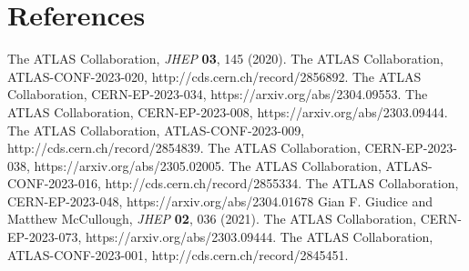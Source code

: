 \documentclass{moriond}
\def\Journal#1#2#3#4{{#1} {\bf #2}, #3 (#4)}
\def\JHEP{\em JHEP}
\begin{document}
\section*{References}

\begin{thebibliography}{99}

 The ATLAS Collaboration, \Journal{\JHEP}{03}{145}{2020}.
 The ATLAS Collaboration, ATLAS-CONF-2023-020, http://cds.cern.ch/record/2856892.
 The ATLAS Collaboration, CERN-EP-2023-034, https://arxiv.org/abs/2304.09553.
 The ATLAS Collaboration, CERN-EP-2023-008, https://arxiv.org/abs/2303.09444.
 The ATLAS Collaboration, ATLAS-CONF-2023-009, http://cds.cern.ch/record/2854839.
 The ATLAS Collaboration, CERN-EP-2023-038, https://arxiv.org/abs/2305.02005.
 The ATLAS Collaboration, ATLAS-CONF-2023-016, http://cds.cern.ch/record/2855334.
 The ATLAS Collaboration, CERN-EP-2023-048, https://arxiv.org/abs/2304.01678
 Gian F. Giudice and Matthew McCullough, \Journal{\JHEP}{02}{036}{2021}.
 The ATLAS Collaboration, CERN-EP-2023-073, https://arxiv.org/abs/2303.09444.
 The ATLAS Collaboration, ATLAS-CONF-2023-001, http://cds.cern.ch/record/2845451.

\end{thebibliography}
\end{document}
